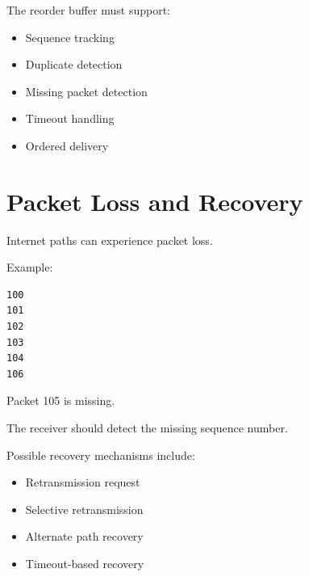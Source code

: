 \documentclass[12pt,a4paper]{article}
\begin{document}
\begin{center}
\end{center}

The reorder buffer must support:

\begin{itemize}
    \item Sequence tracking
    \item Duplicate detection
    \item Missing packet detection
    \item Timeout handling
    \item Ordered delivery
\end{itemize}


\section{Packet Loss and Recovery}

Internet paths can experience packet loss.

Example:

\begin{verbatim}
100
101
102
103
104
106
\end{verbatim}

Packet 105 is missing.

The receiver should detect the missing sequence number.

Possible recovery mechanisms include:

\begin{itemize}
    \item Retransmission request
    \item Selective retransmission
    \item Alternate path recovery
    \item Timeout-based recovery
\end{itemize}
\end{document}
